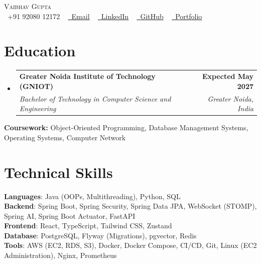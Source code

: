 \documentclass[letterpaper,10pt]{article}
\makeatletter
\newcommand{\resumeSubheading}[4]{
  \vspace{-2pt}\item
    \begin{tabular*}{1.0\textwidth}[t]{l@{\extracolsep{\fill}}r}
      \textbf{#1} & \textbf{\small #2} \\
      \textit{\small#3} & \textit{\small #4} \\
    \end{tabular*}\vspace{-7pt}
}
\newcommand{\resumeSubHeadingListStart}{\begin{itemize}[leftmargin=0.0in, label={}]}
\newcommand{\resumeSubHeadingListEnd}{\end{itemize}}
\makeatother
\begin{document}

\begin{center}
    {\Huge \scshape Vaibhav Gupta} \\ \vspace{1pt}
    \small \raisebox{-0.1\height}\faPhone\ +91 92080 12172 ~
    \href{mailto:vaibhv19.business@gmail.com}{\raisebox{-0.2\height}\faEnvelope\ \underline{Email}} ~
    \href{https://linkedin.com/in/vaibhv19}{\raisebox{-0.2\height}\faLinkedin\ \underline{LinkedIn}} ~
    \href{https://github.com/vaibhv19}{\raisebox{-0.2\height}\faGithub\ \underline{GitHub}} ~
    \href{https://vaibhv19.dev}{\raisebox{-0.2\height}\faGlobe\ \underline{Portfolio}}
    \vspace{-8pt}
\end{center}

\section{Education}
  \resumeSubHeadingListStart
    \resumeSubheading
      {Greater Noida Institute of Technology (GNIOT)}{Expected May 2027}
      {Bachelor of Technology in Computer Science and Engineering}{Greater Noida, India}
  \resumeSubHeadingListEnd
  \vspace{-4pt}
  \begin{itemize}[leftmargin=0in, label={}]
    \small{\item{\textbf{Coursework:} Object-Oriented Programming, Database Management Systems, Operating Systems, Computer Network}}
    \vspace{-10pt}
\end{itemize}

\section{Technical Skills}
 \begin{itemize}[leftmargin=0in, label={}]
    \small{\item{
     \textbf{Languages}{: Java (OOPs, Multithreading), Python, SQL} \\
     \textbf{Backend}{: Spring Boot, Spring Security, Spring Data JPA, WebSocket (STOMP), Spring AI, Spring Boot Actuator, FastAPI} \\
     \textbf{Frontend}{: React, TypeScript, Tailwind CSS, Zustand} \\
     \textbf{Database}{: PostgreSQL, Flyway (Migrations), pgvector, Redis} \\
     \textbf{Tools}{: AWS (EC2, RDS, S3), Docker, Docker Compose, CI/CD, Git, Linux (EC2 Administration), Nginx, Prometheus} \\
    }}
 \end{itemize}
 \vspace{-14pt}
\end{document}
